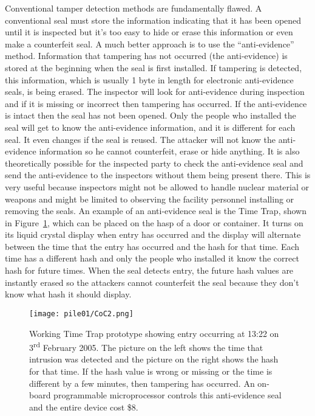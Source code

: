 \documentclass[twoside,titlepage,11pt,twocolumn,a4paper]{article}
\begin{document}
Conventional tamper detection methods are fundamentally flawed. A
conventional seal must store the information indicating that it has
been opened until it is inspected but it’s too easy to hide or erase
this information or even make a counterfeit seal. A much better
approach is to use the ``anti-evidence'' method. Information that
tampering has not occurred (the anti-evidence) is stored at the
beginning when the seal is first
installed. \citep{nuclearSafeguardsAndSec2005} If tampering is
detected, this information, which is usually 1 byte in length for
electronic anti-evidence seals, is being erased.
\citep{unconventionalCoC2010} The inspector will look for
anti-evidence during inspection and if it is missing or incorrect then
tampering has occurred. If the anti-evidence is intact then the seal
has not been opened. Only the people who installed the seal will get
to know the anti-evidence information, and it is different for each
seal. It even changes if the seal is reused. The attacker will not
know the anti-evidence information so he cannot counterfeit, erase or
hide anything. \citep{nuclearSafeguardsAndSec2005} It is also
theoretically possible for the inspected party to check the
anti-evidence seal and send the anti-evidence to the inspectors
without them being present there. \citep{unconventionalCoC2010} This
is very useful because inspectors might not be allowed to handle
nuclear material or weapons and might be limited to observing the
facility personnel installing or removing the seals. An example of an
anti-evidence seal is the Time Trap, shown in Figure~\ref{fig:CoC2},
which can be placed on the hasp of a door or container. It turns on
its liquid crystal display when entry has occurred and the display
will alternate between the time that the entry has occurred and the
hash for that time. Each time has a different hash and only the people
who installed it know the correct hash for future times. When the seal
detects entry, the future hash values are instantly erased so the
attackers cannot counterfeit the seal because they don't know what
hash it should display. \citep{nuclearSafeguardsAndSec2005}

\begin{figure}
  \texttt{[image: pile01/CoC2.png]}
  \caption{Working Time Trap prototype showing entry occurring at
    13:22 on 3\textsuperscript{rd} February 2005. The picture on the
    left shows the time that intrusion was detected and the picture on
    the right shows the hash for that time. If the hash value is wrong
    or missing or the time is different by a few minutes, then
    tampering has occurred. An on-board programmable microprocessor
    controls this anti-evidence seal and the entire device cost
    \$8. \citep{nuclearSafeguardsAndSec2005}}
  \label{fig:CoC2}
\end{figure}
\end{document}
